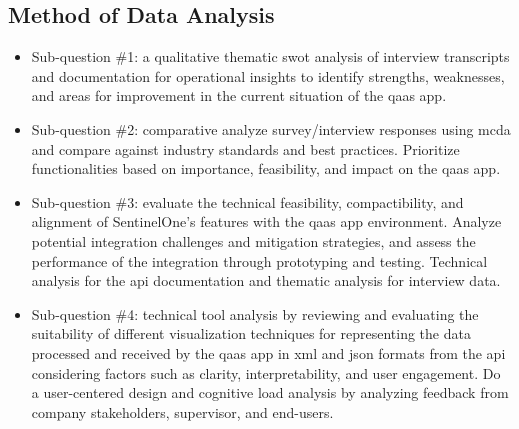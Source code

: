 \begin{multicols}{2}
      \subsection{Method of Data Analysis}
      \begin{itemize}[label=-]
            \item Sub-question \#1: a qualitative thematic \acrshort{swot} analysis of interview transcripts
                  and documentation for operational insights to identify strengths, weaknesses, and areas for
                  improvement in the current situation of the \acrshort{qaas} app.
            \item Sub-question \#2: comparative analyze survey/interview responses using \acrshort{mcda} and
                  compare against industry standards and best practices. Prioritize functionalities based on
                  importance, feasibility, and impact on the \acrshort{qaas} app.
            \item Sub-question \#3: evaluate the technical feasibility, compactibility, and alignment of
                  SentinelOne's features with the \acrshort{qaas} app environment. Analyze potential integration
                  challenges and mitigation strategies, and assess the performance of the integration through
                  prototyping and testing. Technical analysis for the \acrshort{api} documentation and
                  thematic analysis for interview data.
            \item Sub-question \#4: technical tool analysis by reviewing and evaluating the suitability of different
                  visualization techniques for representing the data processed and received by the \acrshort{qaas}
                  app in \acrshort{xml} and \acrshort{json} formats from the \acrshort{api} considering factors such
                  as clarity, interpretability, and user engagement. Do a user-centered design and cognitive load
                  analysis by analyzing feedback from company stakeholders, supervisor, and end-users.
      \end{itemize}

\end{multicols}
